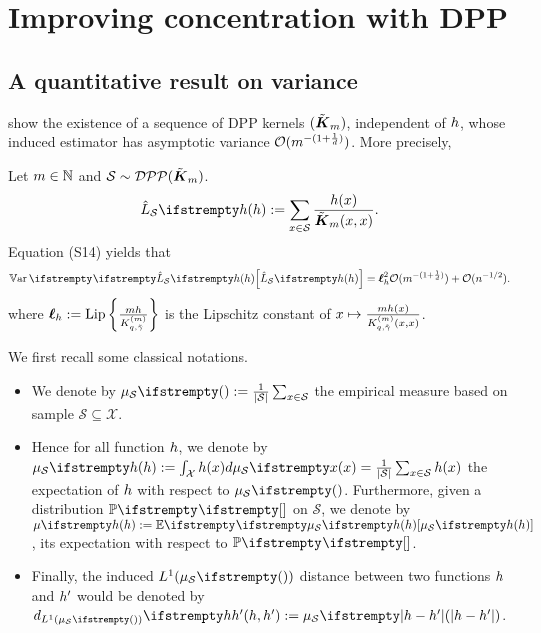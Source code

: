 

\chapter{Improving concentration with DPP}
\section{A quantitative result on variance}


\cite{bardenet2021sgddpp} show the existence of a sequence of DPP kernels $(\tilde{\boldsymbol K}_{m})$, independent of $h$, whose induced estimator has asymptotic variance $\mathcal{O}( m ^{-(1+\frac 1 d)})$. More precisely, 

\begin{tcolorbox}
	\begin{theorem}
		\label{thm_sgdpaper}
		Let $m\in \mathbb{N}$ and $\mathcal{S} \sim  \mathcal{DPP}(\tilde{\boldsymbol K}_{m})$.
		\begin{equation}
			\estloss{\mathcal{S}}{\threequery} := \sum_{x \in \mathcal{S}} \frac{\threequery(x)}{\opekernel{m}(x,x)}.
		\end{equation}
		Equation (S14) yields that 
		\begin{equation}
			\Var{}{\estloss{\mathcal{S}}{\threequery}} = \lipschitz^2_\threequery \OO( m ^{-(1+\frac 1 d)}) +\OO( n^{-1/2}).
		\end{equation}
		where $\boldsymbol\ell_h := \operatorname{Lip}\left\{\frac{mh}{K^{(m)}_{q, \tilde \gamma}} \right\}$ is the Lipschitz constant of $x \mapsto \frac{mh(x)}{K^{(m)}_{q, \tilde \gamma}(x,x)}$.
	\end{theorem}
\end{tcolorbox}



We first recall some classical notations.
\begin{itemize}
	\item We denote by $\empdistr{\mathcal{S}}{}:=\frac{1}{|\mathcal{S}|} \sum_{x \in \mathcal{S}}$ the empirical measure based on sample $\mathcal{S}  \subseteq \mathcal{X}$. 
	\item Hence for all function $h$, we denote by $\empdistr{\mathcal{S}}{\threequery}:=\int_{\mathcal{X}} \threequery(x) d\empdistr{\mathcal{S}}{x} = \frac{1}{|\mathcal{S}|} \sum_{x \in \mathcal{S}} \threequery(x)$ the expectation of $h$ with respect to $\empdistr{\mathcal{S}}{}$. Furthermore, given a distribution $\PP{}{}$ on $\mathcal{S}$, we denote by $\meanempdistr{\threequery}:=\EE{}{\empdistr{\mathcal{S}}{\threequery}}$, its expectation with respect to $\PP{}{}$. 
	\item Finally, the induced $L^1(\empdistr{\mathcal{S}}{})$ distance between two functions $h$ and $h'$ would be denoted by $\dlone{\empdistr{\mathcal{S}}{}}{\threequery}{\threequery'}:=\empdistr{\mathcal{S}}{|\threequery - \threequery'|}$.
\end{itemize}  


